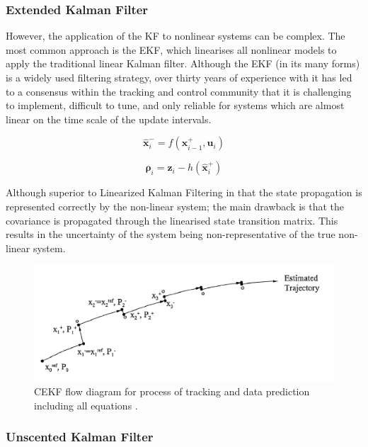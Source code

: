 \subsubsection{Extended Kalman Filter}

However, the application of the KF to nonlinear systems can be complex. The most common approach is the \gls{EKF}, which linearises all nonlinear models to apply the traditional linear Kalman filter. Although the EKF (in its many forms) is a widely used filtering strategy, over thirty years of experience with it has led to a consensus within the tracking and control community that it is challenging to implement, difficult to tune, and only reliable for systems which are almost linear on the time scale of the update intervals.

\begin{equation}
   \hat{\bm{x}}_{i}^- = f({\bm{x}}_{i-1}^+,\bm{u}_{i})
\end{equation}

\begin{equation}
   \bm{\rho}_i = \bm{z}_i - h(\hat{\bm{x}}_{i}^+)
\end{equation}

Although superior to Linearized Kalman Filtering in that the state propagation
is represented correctly by the non-linear system; the main drawback is that the
covariance is propagated through the linearised state transition matrix. This
results in the uncertainty of the system being non-representative of the true
non-linear system.

\begin{figure}[htp]
    \centering
    \includegraphics[width=0.8\linewidth]{graphics/ekf.PNG}
    \caption{CEKF flow diagram for process of tracking and data prediction including all equations \cite{3}.}
    \label{fig:LKF}
\end{figure}

\subsubsection{Unscented Kalman Filter}

